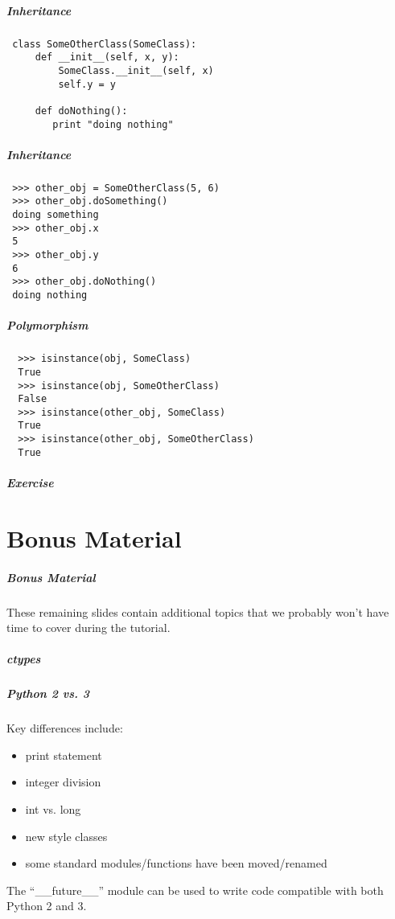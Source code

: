 \documentclass[hyperref={colorlinks, linkcolor=blue, urlcolor=blue}]{beamer}
\begin{document}
\begin{frame}[fragile]
  \frametitle{Inheritance}
    \begin{lstlisting}
 class SomeOtherClass(SomeClass):
     def __init__(self, x, y):
         SomeClass.__init__(self, x)
         self.y = y

     def doNothing():
        print "doing nothing"
    \end{lstlisting}
\end{frame}

\begin{frame}[fragile]
  \frametitle{Inheritance}
    \begin{lstlisting}
 >>> other_obj = SomeOtherClass(5, 6)
 >>> other_obj.doSomething()
 doing something
 >>> other_obj.x
 5
 >>> other_obj.y
 6
 >>> other_obj.doNothing()
 doing nothing 
  \end{lstlisting}
\end{frame}

\begin{frame}[fragile]
  \frametitle{Polymorphism}

  \begin{lstlisting}
  >>> isinstance(obj, SomeClass)
  True
  >>> isinstance(obj, SomeOtherClass)
  False
  >>> isinstance(other_obj, SomeClass)
  True
  >>> isinstance(other_obj, SomeOtherClass)
  True
  \end{lstlisting}
\end{frame}

\begin{frame}
  \frametitle{Exercise}
\end{frame}


\part{Bonus Material} 

\begin{frame}
  \frametitle{Bonus Material}

  These remaining slides contain additional topics that we probably
  won't have time to cover during the tutorial.
\end{frame}

\begin{frame}
  \frametitle{ctypes}
\end{frame}

\begin{frame}
  \frametitle{Python 2 vs. 3}
  Key differences include:
  \begin{itemize}
  \item print statement
  \item integer division
  \item int vs. long
  \item new style classes
  \item some standard modules/functions have been moved/renamed
  \end{itemize}
  The ``\_\_future\_\_'' module can be used to write code compatible with both Python 2 and 3.
\end{frame}
\end{document}
